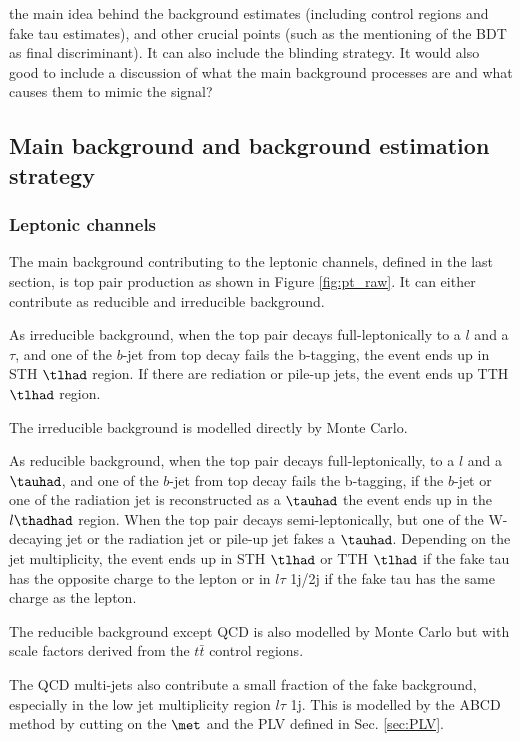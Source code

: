 the main idea behind the background estimates (including control regions and fake tau estimates), and other crucial points (such as the mentioning of the BDT as final discriminant). It can also include the blinding strategy. It would also good to include a discussion of what the main background processes are and what causes them to mimic the signal?


\subsection{Main background and background estimation strategy}

\subsubsection{Leptonic channels}

The main background contributing to the leptonic channels, defined in the last section, is top pair production as shown in Figure \ref{fig:pt_raw}. It can either contribute as reducible and irreducible background.

As irreducible background, when the top pair decays full-leptonically to a $l$ and a $\tau$, and one of the $b$-jet from top decay fails the b-tagging, the event ends up in STH $\tlhad$ region. If there are rediation or pile-up jets, the event ends up TTH $\tlhad$ region.

The irreducible background is modelled directly by Monte Carlo.

As reducible background, when the top pair decays full-leptonically, to a $l$ and a $\tauhad$, and one of the $b$-jet from top decay fails the b-tagging, if the $b$-jet or one of the radiation jet is reconstructed as a $\tauhad$ the event ends up in the $l\thadhad$ region. When the top pair decays semi-leptonically, but one of the W-decaying jet or the radiation jet or pile-up jet fakes a $\tauhad$. Depending on the jet multiplicity, the event ends up in STH $\tlhad$ or TTH $\tlhad$ if the fake tau has the opposite charge to the lepton or in $l\tau$ 1j/2j if the fake tau has the same charge as the lepton. 

The reducible background except QCD is also modelled by Monte Carlo but with scale factors derived from the $t\bar{t}$ control regions.

The QCD multi-jets also contribute a small fraction of the fake background, especially in the low jet multiplicity region $l\tau$ 1j. This is modelled by the ABCD method by cutting on the $\met$ and the PLV defined in Sec. \ref{sec:PLV}.

